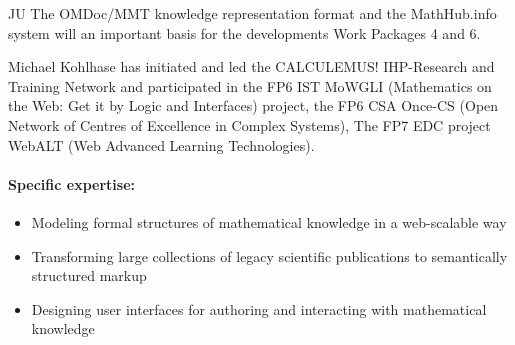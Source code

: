 \begin{sitedescription}{JU}
The \textsf{OMDoc/MMT} knowledge representation format and the \textsf{MathHub.info}
system will an important basis for the developments Work Packages 4 and 6.

Michael Kohlhase has initiated and led the CALCULEMUS! IHP-Research and Training Network
and participated in the FP6 IST MoWGLI (Mathematics on the Web: Get it by Logic and
Interfaces) project, the FP6 CSA Once-CS (Open Network of Centres of Excellence in Complex
Systems), The FP7 EDC project WebALT (Web Advanced Learning Technologies).

\paragraph{Specific expertise:}
\begin{itemize}
\item Modeling formal structures of mathematical knowledge in a web-scalable way
\item Transforming large collections of legacy scientific publications to semantically
  structured markup
\item Designing user interfaces for authoring and interacting with mathematical knowledge
\end{itemize}
\end{sitedescription}

